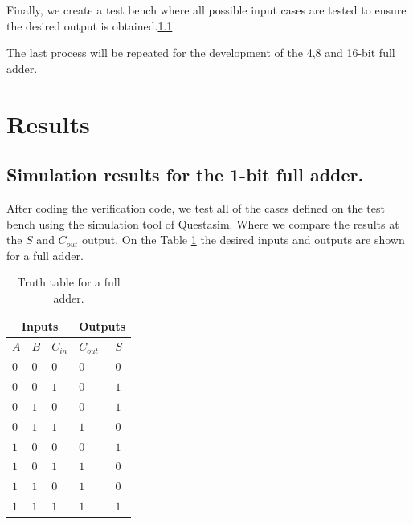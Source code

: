 \documentclass[conference]{IEEEtran}
\begin{document}
	Finally, we create a test bench where all possible input cases are tested to ensure the desired output is obtained.\ref{}
	
	The last process will be repeated for the development of the 4,8 and 16-bit full adder.
	
	\section{Results}
	
	\subsection{Simulation results for the 1-bit full adder.}
	After coding the verification code, we test all of the cases defined on the test bench using the simulation tool of Questasim. Where we compare the results at the \(S\) and \(C_{out}\) output. On the Table \ref{tab:FA_1B_TT} the desired inputs and outputs are shown for a full adder.
	
	\begin{table}[H]
		\centering
		\begin{tabular}{|m{.1cm}|m{0.2cm}|m{0.5cm}|m{0.5cm}|m{0.1cm}|}
			\hline
			\multicolumn{3}{|c|}{Inputs} & \multicolumn{2}{c|}{Outputs} \\
			\hline
			\(A\) & \(B\) & \(C_{in}\) & \(C_{out}\) & \(S\) \\
			\hline
			\(0\) & \centering\(0\) & \centering\(0\) & \centering\(0\) & \(0\) \\
			\(0\) & \centering\(0\) & \centering\(1\) & \centering\(0\) & \(1\) \\
			\(0\) & \centering\(1\) & \centering\(0\) & \centering\(0\) & \(1\) \\
			\(0\) & \centering\(1\) & \centering\(1\) & \centering\(1\) & \(0\) \\
			\(1\) & \centering\(0\) & \centering\(0\) & \centering\(0\) & \(1\) \\
			\(1\) & \centering\(0\) & \centering\(1\) & \centering\(1\) & \(0\) \\
			\(1\) & \centering\(1\) & \centering\(0\) & \centering\(1\) & \(0\) \\
			\(1\) & \centering\(1\) & \centering\(1\) & \centering\(1\) & \(1\) \\
			\hline
		\end{tabular}
		\caption{Truth table for a full adder.}
		\label{tab:FA_1B_TT}
	\end{table}
	
\end{document}
